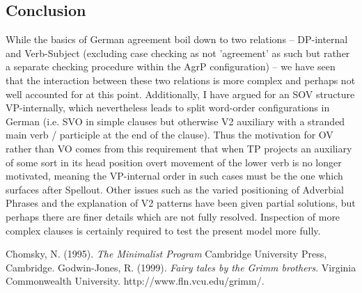 \documentclass[12pt]{article}
\begin{document}
\begin{flushleft}
\section{Conclusion}
While the basics of German agreement boil down to two relations -- DP-internal and Verb-Subject (excluding case checking as not 'agreement' as such but rather a separate checking procedure within the AgrP configuration) -- we have seen that the interaction between these two relations is more complex and perhaps not well accounted for at this point. Additionally, I have argued for an SOV structure VP-internally, which nevertheless leads to split word-order configurations in German (i.e. SVO in simple clauses but otherwise V2 auxiliary with a stranded main verb / participle at the end of the clause). Thus the motivation for OV rather than VO comes from this requirement that when TP projects an auxiliary of some sort in its head position overt movement of the lower verb is no longer motivated, meaning the VP-internal order in such cases must be the one which surfaces after Spellout. Other issues such as the varied positioning of Adverbial Phrases and the explanation of V2 patterns have been given partial solutions, but perhaps there are finer details which are not fully resolved. Inspection of more complex clauses is certainly required to test the present model more fully.  

\newpage

\begin{thebibliography}{9}
	Chomsky, N.
	(1995).
	{\it The Minimalist Program}
	Cambridge University Press,
	Cambridge.
  	Godwin-Jones, R.
	(1999).
  	{\it Fairy tales by the Grimm brothers}.
  	Virginia Commonwealth University.
  	http://www.fln.vcu.edu/grimm/.
\end{thebibliography}

\end{flushleft}
\end{document}

